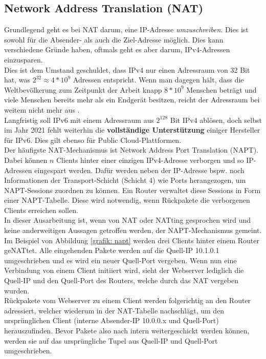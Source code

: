 \subsection{Network Address Translation (NAT)}
Grundlegend geht es bei \gls{NAT} darum, eine IP-Adresse \textit{umzuschreiben}. Dies ist sowohl für die Absender- als auch die Ziel-Adresse möglich. Dies kann verschiedene Gründe haben, oftmals geht es aber darum, IPv4-Adressen einzusparen.\\
Dies ist dem Umstand geschuldet, dass IPv4 nur einen Adressraum von 32 Bit hat, was $2^{32} \approx 4*10^9$ Adressen entspricht. Wenn man dagegen hält, dass die Weltbevölkerung zum Zeitpunkt der Arbeit knapp $8*10^9$ Menschen beträgt und viele Menschen bereits mehr als ein Endgerät besitzen, reicht der Adressraum bei weitem nicht mehr aus \cite{weltbevoelkerung2020dsw}.\\
Langfristig soll IPv6 mit einem Adressraum aus $2^{128}$ Bit IPv4 ablösen, doch selbst im Jahr 2021 fehlt weiterhin die \textbf{vollständige Unterstützung} einiger Hersteller für IPv6. Dies gilt ebenso für Public Cloud-Plattformen.\\
Der häufigste \gls{NAT}-Mechanismus ist Network Address Port Translation (NAPT). Dabei können $n$ \gls{Client}s hinter einer einzigen IPv4-Adresse \glqq verborgen\grqq{} und so IP-Adressen eingespart werden. Dafür werden neben der IP-Adresse bspw. noch Informationen der Transport-Schicht (Schicht 4) wie Ports herangezogen, um NAPT-Sessions zuordnen zu können. Ein Router verwaltet diese Sessions in Form einer NAPT-Tabelle. Diese wird notwendig, wenn Rückpakete die verborgenen \gls{Client}s erreichen sollen.\\
In dieser Ausarbeitung ist, wenn von \gls{NAT} oder \gls{NAT}ting gesprochen wird und keine anderweitigen Aussagen getroffen werden, der NAPT-Mechanismus gemeint.\\
Im Beispiel von Abbildung \ref{grafik: napt} werden drei \gls{Client}s hinter einem Router ge\gls{NAT}tet. Alle eingehenden Pakete werden auf die Quell-IP 10.1.0.1 umgeschrieben und es wird ein neuer Quell-Port vergeben. Wenn nun eine Verbindung von einem \gls{Client} initiiert wird, sieht der Webserver lediglich die Quell-IP und den Quell-Port des Routers, welche durch das \gls{NAT} vergeben wurden.\\
Rückpakete vom Webserver zu einem \gls{Client} werden folgerichtig an den Router adressiert, welcher wiederum in der \gls{NAT}-Tabelle nachschlägt, um den ursprünglichen \gls{Client} (interne Absender-IP 10.0.0.x und Quell-Port) herauszufinden. Bevor Pakete also nach intern weitergeschickt werden können, werden sie auf das ursprüngliche Tupel aus Quell-IP und Quell-Port umgeschrieben.\\

